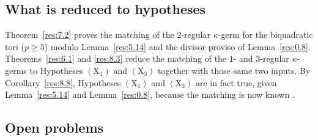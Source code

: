 \documentclass[12pt,letterpaper]{amsart}
\theoremstyle{plain}
\theoremstyle{definition}
\theoremstyle{remark}
\theoremstyle{definition}
\begin{document}
\subsection*{What is reduced to hypotheses}
Theorem~\ref{res:7.2} proves the matching of the $2$-regular $\kappa$-germ for
the biquadratic tori ($p\ge5$) modulo Lemma~\ref{res:5.14} and the divisor
proviso of Lemma~\ref{res:0.8}. Theorems~\ref{res:6.1} and \ref{res:8.3} reduce
the matching of the $1$- and $3$-regular $\kappa$-germs to Hypotheses
$(\mathrm X_1)$ and $(\mathrm X_3)$ together with those same two inputs. By
Corollary~\ref{res:8.8}, Hypotheses $(\mathrm X_1)$ and $(\mathrm X_3)$ are in
fact true, given Lemma~\ref{res:5.14} and Lemma~\ref{res:0.8}, because the
matching is now known \cite{GH16}.

\subsection*{Open problems}
\end{document}

